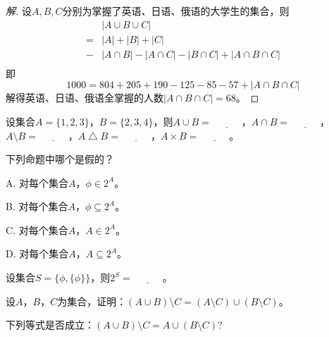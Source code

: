 \begin{proof}[解]
  设$A,B,C$分别为掌握了英语、日语、俄语的大学生的集合，则
  \begin{equation*}
    \begin{split}
      &|A \cup B \cup C|\\
      = &|A| + |B| + |C|\\
      - & |A \cap B| - |A \cap C| - |B \cap C| + |A \cap B \cap C|\\
    \end{split}
  \end{equation*}
  即
  \begin{equation*}
    1000 = 804 + 205 + 190 - 125 - 85 - 57 +  |A \cap B \cap C|
  \end{equation*}
  解得英语、日语、俄语全掌握的人数$|A \cap B \cap C|=68$。
\end{proof}
  \begin{Exercise}
    设集合$A=\{1,2,3\}$，$B=\{2,3,4\}$，则$A\cup B=\underline{\quad\quad\quad}$，$A\cap B=\underline{\quad\quad\quad}$，$A\setminus B=\underline{\quad\quad\quad}$，$A\bigtriangleup B=\underline{\quad\quad\quad}$，$A\times B=\underline{\quad\quad\quad}$。
  \end{Exercise}
  \begin{Exercise}
    下列命题中哪个是假的？

    A. 对每个集合$A$，$\phi \in 2^A$。

    B. 对每个集合$A$，$\phi \subseteq 2^A$。

    C. 对每个集合$A$，$A \in 2^A$。

    D. 对每个集合$A$，$A \subseteq 2^A$。
  \end{Exercise}
    \begin{Exercise}
   设集合$S=\{\phi, \{\phi\}\}$，则$2^S=\underline{\quad\quad\quad}$。
  \end{Exercise}
  \begin{Exercise}
   设$A$，$B$，$C$为集合，证明：$(A\cup B) \setminus C = (A\setminus C) \cup
   (B\setminus C)$。
 \end{Exercise}
    \begin{Exercise}
      下列等式是否成立：$(A\cup B) \setminus C = A \cup (B\setminus C)$?
    \end{Exercise}

